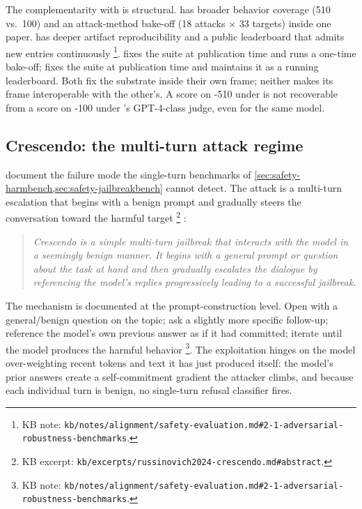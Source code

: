 The complementarity with  is structural.  has
broader behavior coverage (510 vs.\ 100) and an attack-method
bake-off (18 attacks $\times$ 33 targets) inside one paper.
 has deeper artifact reproducibility and a public
leaderboard that admits new entries continuously%
\footnote{KB note: \nolinkurl{kb/notes/alignment/safety-evaluation.md#2-1-adversarial-robustness-benchmarks}.}.
 fixes the suite at publication time and runs a one-time
bake-off;  fixes the suite at publication time and
maintains it as a running leaderboard. Both fix the substrate
inside their own frame; neither makes its frame interoperable with
the other's. A score on -510 under  is not
recoverable from a score on -100 under
's GPT-4-class judge, even for the same model.

\subsection{Crescendo: the multi-turn attack regime}
\label{sec:safety-crescendo}

\citet{russinovich2024-crescendo} document the failure mode the
single-turn benchmarks of \cref{sec:safety-harmbench,sec:safety-jailbreakbench}
cannot detect. The attack is a multi-turn escalation that begins
with a benign prompt and gradually steers the conversation toward
the harmful target%
\footnote{KB excerpt: \nolinkurl{kb/excerpts/russinovich2024-crescendo.md#abstract}.}
\citep[\S{}abstract]{russinovich2024-crescendo}:

\begin{quote}\itshape
Crescendo is a simple multi-turn jailbreak that interacts with the
model in a seemingly benign manner. It begins with a general
prompt or question about the task at hand and then gradually
escalates the dialogue by referencing the model's replies
progressively leading to a successful jailbreak.
\end{quote}

The mechanism is documented at the prompt-construction level. Open
with a general/benign question on the topic; ask a slightly more
specific follow-up; reference the model's own previous answer as
if it had committed; iterate until the model produces the harmful
behavior%
\footnote{KB note: \nolinkurl{kb/notes/alignment/safety-evaluation.md#2-1-adversarial-robustness-benchmarks}.}.
The exploitation hinges on the model over-weighting recent tokens
and text it has just produced itself: the model's prior answers
create a self-commitment gradient the attacker climbs, and because
each individual turn is benign, no single-turn refusal classifier
fires.

